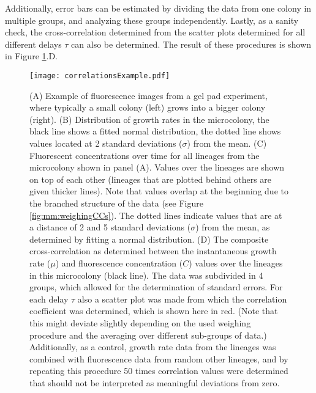 {Additionally, error bars can be estimated by dividing the data from one colony in multiple groups, and analyzing these groups independently.
%
Lastly, as a sanity check, the cross-correlation determined from the scatter plots determined for all different delays $\tau$ can also be determined.
%
The result of these procedures is shown in Figure \ref{fig:mm:exampleCC}.D.


\begin{figure}
	\centering
	\texttt{[image: correlationsExample.pdf]}
	\caption{ 
		(A) Example of fluorescence images from a gel pad experiment, where typically a small colony (left) grows into a bigger colony (right).
		(B) Distribution of growth rates in the microcolony, the black line shows a fitted normal distribution, the dotted line shows values located at 2 standard deviations ($\sigma$) from the mean.
		(C) Fluorescent concentrations over time for all lineages from the microcolony shown in panel (A). Values over the lineages are shown on top of each other (lineages that are plotted behind others are given thicker lines). Note that values overlap at the beginning due to the branched structure of the data (see Figure \ref{fig:mm:weighingCCs}). The dotted lines indicate values that are at a distance of 2 and 5 standard deviations ($\sigma$) from the mean, as determined by fitting a normal distribution.
		(D) The composite cross-correlation as determined between the instantaneous growth rate ($\mu$) and fluorescence concentration ($C$) values over the lineages in this microcolony (black line). The data was subdivided in 4 groups, which allowed for the determination of standard errors. For each delay $\tau$ also a scatter plot was made from which the correlation coefficient was determined, which is shown here in red. (Note that this might deviate slightly depending on the used weighing procedure and the averaging over different sub-groups of data.) Additionally, as a control, growth rate data from the lineages was combined with fluorescence data from random other lineages, and by repeating this procedure 50 times correlation values were determined that should not be interpreted as meaningful deviations from zero.
	}
	\label{fig:mm:exampleCC}
\end{figure}





}
